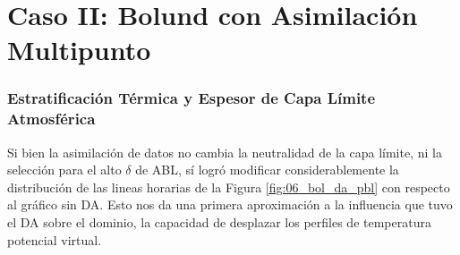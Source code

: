 \vspace*{\fill}
\newpage





























\section{Caso II: Bolund con Asimilación Multipunto}
\subsubsection{Estratificación Térmica y Espesor de Capa Límite Atmosférica}
Si bien la asimilación de datos no cambia la neutralidad de la capa límite, ni la selección para el alto $\delta$ de ABL, sí logró modificar considerablemente la distribución de las lineas horarias  de la Figura \ref{fig:06_bol_da_pbl} con respecto al gráfico sin DA. Esto nos da una primera aproximación a la influencia que tuvo el DA sobre el dominio, la capacidad de desplazar los perfiles de temperatura potencial virtual.

